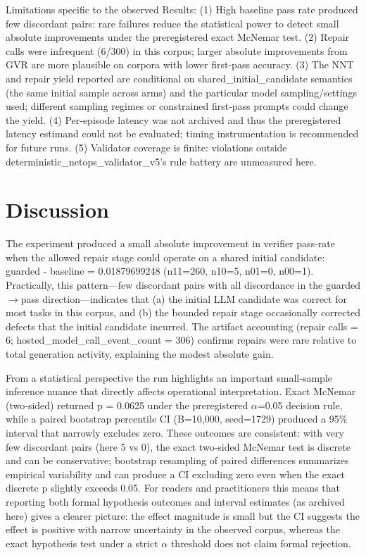 \documentclass[conference]{IEEEtran}
\begin{document}
Limitations specific to the observed Results: (1) High baseline pass rate produced few discordant pairs: rare failures reduce the statistical power to detect small absolute improvements under the preregistered exact McNemar test. (2) Repair calls were infrequent (6/300) in this corpus; larger absolute improvements from GVR are more plausible on corpora with lower first‑pass accuracy. (3) The NNT and repair yield reported are conditional on shared\_initial\_candidate semantics (the same initial sample across arms) and the particular model sampling/settings used; different sampling regimes or constrained first‑pass prompts could change the yield. (4) Per‑episode latency was not archived and thus the preregistered latency estimand could not be evaluated; timing instrumentation is recommended for future runs. (5) Validator coverage is finite: violations outside deterministic\_netops\_validator\_v5's rule battery are unmeasured here.

\section{Discussion}
The experiment produced a small absolute improvement in verifier pass‑rate when the allowed repair stage could operate on a shared initial candidate: guarded - baseline = 0.01879699248 (n11=260, n10=5, n01=0, n00=1). Practically, this pattern---few discordant pairs with all discordance in the guarded\ensuremath{\rightarrow}pass direction---indicates that (a) the initial LLM candidate was correct for most tasks in this corpus, and (b) the bounded repair stage occasionally corrected defects that the initial candidate incurred. The artifact accounting (repair calls = 6; hosted\_model\_call\_event\_count = 306) confirms repairs were rare relative to total generation activity, explaining the modest absolute gain.

From a statistical perspective the run highlights an important small‑sample inference nuance that directly affects operational interpretation. Exact McNemar (two‑sided) returned p = 0.0625 under the preregistered \ensuremath{\alpha}=0.05 decision rule, while a paired bootstrap percentile CI (B=10,000, seed=1729) produced a 95\% interval that narrowly excludes zero. These outcomes are consistent: with very few discordant pairs (here 5 vs 0), the exact two‑sided McNemar test is discrete and can be conservative; bootstrap resampling of paired differences summarizes empirical variability and can produce a CI excluding zero even when the exact discrete p slightly exceeds 0.05. For readers and practitioners this means that reporting both formal hypothesis outcomes and interval estimates (as archived here) gives a clearer picture: the effect magnitude is small but the CI suggests the effect is positive with narrow uncertainty in the observed corpus, whereas the exact hypothesis test under a strict \ensuremath{\alpha} threshold does not claim formal rejection.
\end{document}
